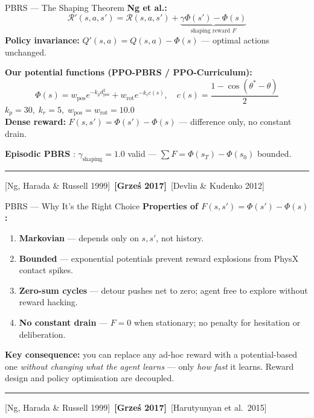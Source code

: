 \documentclass[aspectratio=169,xcolor=dvipsnames,t]{beamer}
\newcommand{\litfooter}[1]{%
  \vspace{2pt}%
  \hrule%
  \vspace{2pt}%
  {\tiny\color{LightDarkGrey} #1}%
}
\begin{document}
\begin{frame}[t]{PBRS — The Shaping Theorem}
  \textbf{Ng et al.:}
  \[
  \boxed{\mathcal{R}'(s,a,s') = \mathcal{R}(s,a,s') + \underbrace{\gamma\Phi(s') - \Phi(s)}_{\text{shaping reward }F}}
  \]
  \textbf{Policy invariance:} $Q'(s,a) = Q(s,a) - \Phi(s)$ — optimal actions unchanged.

  \vspace{4pt}
  \textbf{Our potential functions (PPO-PBRS / PPO-Curriculum):}
  \[
  \Phi(s) = w_{\text{pos}} e^{-k_p d_{\text{pos}}^2} + w_{\text{rot}} e^{-k_r c(s)},\quad
  c(s) = \frac{1-\cos(\theta^*-\theta)}{2}
  \]
  $k_p{=}30,\; k_r{=}5,\; w_{\text{pos}}{=}w_{\text{rot}}{=}10.0$\\
  \textbf{Dense reward:} $F(s,s') = \Phi(s') - \Phi(s)$  —  difference only, no constant drain.

  \vspace{4pt}
  \textbf{Episodic PBRS} : $\gamma_{\text{shaping}}{=}1.0$ valid — $\sum F = \Phi(s_T)-\Phi(s_0)$ bounded.

  \vfill\litfooter{[Ng, Harada \& Russell 1999]~\textbf{[Grze\'s 2017]}~[Devlin \& Kudenko 2012]}
\end{frame}



\begin{frame}[t]{PBRS — Why It's the Right Choice}
  \textbf{Properties of $F(s,s') = \Phi(s') - \Phi(s)$:}
  \begin{enumerate}
    \item \textbf{Markovian} — depends only on $s,s'$, not history. 
    \item \textbf{Bounded} — exponential potentials prevent reward explosions from PhysX contact spikes.
    \item \textbf{Zero-sum cycles} — detour pushes net to zero; agent free to explore without reward hacking.
    \item \textbf{No constant drain} — $F{=}0$ when stationary; no penalty for hesitation or deliberation.
  \end{enumerate}

  \vspace{4pt}
  \textbf{Key consequence:} you can replace any ad-hoc reward with a potential-based one \emph{without changing what the agent learns} — only \emph{how fast} it learns. Reward design and policy optimisation are decoupled.

  \vfill\litfooter{[Ng, Harada \& Russell 1999]~\textbf{[Grze\'s 2017]}~[Harutyunyan et al.\ 2015]}
\end{frame}
\end{document}
